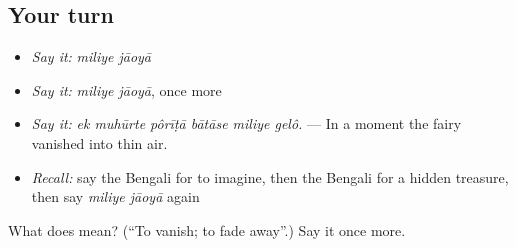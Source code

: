 \subsection*{Your turn}
\begin{itemize}
\raggedright
  \item \emph{Say it:} \emph{miliye jāoyā}
  \item \emph{Say it:} \emph{miliye jāoyā}, once more
  \item \emph{Say it:} \emph{ek muhūrte pôrīṭā bātāse miliye gelô.} — In a moment the fairy vanished into thin air.
  \item \emph{Recall:} say the Bengali for to imagine, then the Bengali for a hidden treasure, then say \emph{miliye jāoyā} again
\end{itemize}

\begin{tcolorbox}[breakable,colback=teal!4,colframe=teal!35!black,title={Before you move on}]
What does   mean? (\textquotedblleft{}To vanish; to fade away\textquotedblright{}.) Say it once more.
\end{tcolorbox}
